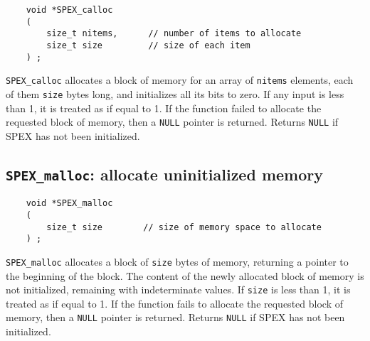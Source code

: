 \documentclass[12pt]{report}
\theoremstyle{definition}
\begin{document}
\begin{mdframed}[userdefinedwidth=6in]
{\footnotesize
\begin{verbatim}
    void *SPEX_calloc 
    ( 
        size_t nitems,      // number of items to allocate 
        size_t size         // size of each item 
    ) ;
\end{verbatim}
} \end{mdframed}

\verb|SPEX_calloc| allocates a block of memory for an array of \verb|nitems|
elements, each of them \verb|size| bytes long, and initializes all its bits to
zero. If any input is less than 1, it is treated as if equal to 1. If the
function failed to allocate the requested block of memory, then a \verb|NULL|
pointer is returned.
Returns \verb|NULL| if SPEX has not been initialized.

\newpage
\subsection{\texttt{SPEX\_malloc}: allocate uninitialized memory}
\label{ss:SPEX_malloc}

\begin{mdframed}[userdefinedwidth=6in]
{\footnotesize
\begin{verbatim}
    void *SPEX_malloc
    (
        size_t size        // size of memory space to allocate
    ) ;
\end{verbatim}
} \end{mdframed}

\verb|SPEX_malloc| allocates a block of \verb|size| bytes of memory, returning
a pointer to the beginning of the block. The content of the newly allocated
block of memory is not initialized, remaining with indeterminate values.
If \verb|size| is less than 1, it is treated as if equal to 1. If the function
fails to allocate the requested block of memory, then a \verb|NULL| pointer is
returned.
Returns \verb|NULL| if SPEX has not been initialized.

\end{document}
